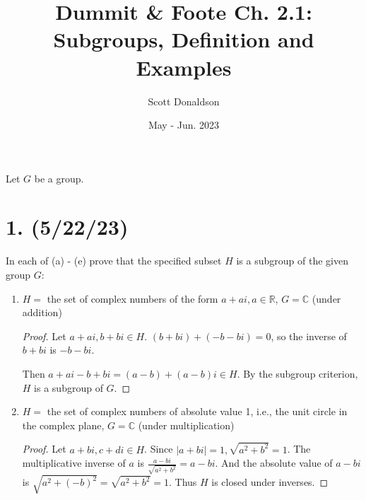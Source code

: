 \documentclass{article}
\title{Dummit \& Foote Ch. 2.1: Subgroups, Definition and Examples}
\author{Scott Donaldson}
\date{May - Jun. 2023}
\begin{document}
\maketitle

Let $G$ be a group.

\section*{1. (5/22/23)}

In each of (a) - (e) prove that the specified subset $H$ is a subgroup of the given group $G$:

\begin{enumerate}[label=(\alph*)]
    \item $H = $ the set of complex numbers of the form $a + ai, a \in \mathbb{R}$, $G = \mathbb{C}$ (under addition)
          \begin{proof}
            Let $a + ai, b + bi \in H$. $(b + bi) + (-b - bi) = 0$, so the inverse of $b + bi$ is $-b - bi$.

            Then $a + ai - b + bi = (a - b) + (a - b)i \in H$. By the subgroup criterion, $H$ is a subgroup of $G$.
          \end{proof}
    \item $H = $ the set of complex numbers of absolute value 1, i.e., the unit circle in the complex plane, $G = \mathbb{C}$ (under multiplication)
          \begin{proof}
            Let $a + bi, c + di \in H$. Since $|a + bi| = 1, \sqrt{a^2 + b^2} = 1$. The multiplicative inverse of $a$ is $\frac{a - bi}{\sqrt{a^2 + b^2}} = a - bi$. And the absolute value of $a - bi$ is $\sqrt{a^2 + (-b)^2} = \sqrt{a^2 + b^2} = 1$. Thus $H$ is closed under inverses.


\end{proof}
\end{enumerate}
\end{document}
